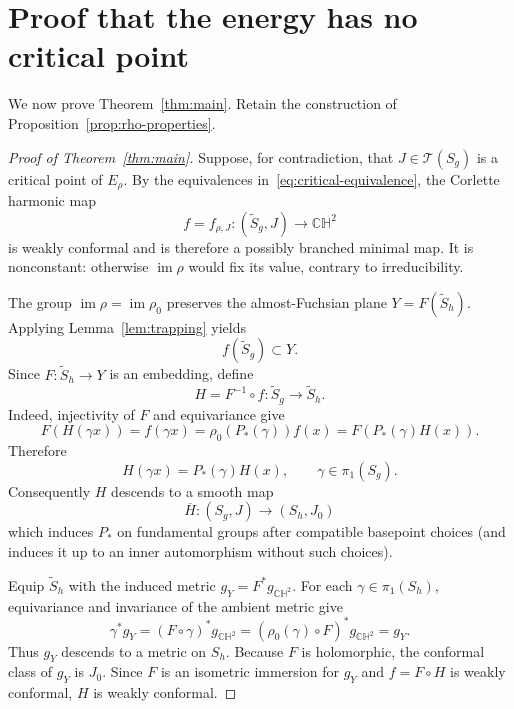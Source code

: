 \documentclass[12pt]{amsart}
\theoremstyle{remark}
\newcommand{\CH}{\mathbb{CH}}
\newcommand{\Teich}{\mathcal T}
\newcommand{\im}{\operatorname{im}}
\begin{document}
\section{Proof that the energy has no critical point}

We now prove Theorem~\ref{thm:main}.  Retain the construction of
Proposition~\ref{prop:rho-properties}.

\begin{proof}[Proof of Theorem~\ref{thm:main}]
Suppose, for contradiction, that $J\in\Teich(S_g)$ is a critical point of
$E_\rho$.  By the equivalences in~\eqref{eq:critical-equivalence}, the
Corlette harmonic map
\[
f=f_{\rho,J}:(\widetilde S_g,J)\longrightarrow\CH^2
\]
is weakly conformal and is therefore a possibly branched minimal map.  It is
nonconstant: otherwise $\im\rho$ would fix its value, contrary to
irreducibility.

The group $\im\rho=\im\rho_0$ preserves the almost-Fuchsian plane
$Y=F(\widetilde S_h)$.  Applying Lemma~\ref{lem:trapping} yields
\begin{equation}\label{eq:image-in-Y}
 f(\widetilde S_g)\subset Y.
\end{equation}
Since $F:\widetilde S_h\to Y$ is an embedding, define
\[
 H=F^{-1}\circ f:\widetilde S_g\longrightarrow\widetilde S_h.
\]
Indeed, injectivity of $F$ and equivariance give
\[
 F(H(\gamma x))=f(\gamma x)=\rho_0(P_*(\gamma))f(x)
 =F(P_*(\gamma)H(x)).
\]
Therefore
\begin{equation}\label{eq:H-equivariance}
 H(\gamma x)=P_*(\gamma)H(x),
 \qquad \gamma\in\pi_1(S_g).
\end{equation}
Consequently $H$ descends to a smooth map
\begin{equation}\label{eq:Hbar}
 \overline H:(S_g,J)\longrightarrow(S_h,J_0)
\end{equation}
which induces $P_*$ on fundamental groups after compatible basepoint choices
(and induces it up to an inner automorphism without such choices).

Equip $\widetilde S_h$ with the induced metric $g_Y=F^*g_{\CH^2}$.  For each
$\gamma\in\pi_1(S_h)$, equivariance and invariance of the ambient metric give
\[
 \gamma^*g_Y=(F\circ\gamma)^*g_{\CH^2}
 =(\rho_0(\gamma)\circ F)^*g_{\CH^2}=g_Y.
\]
Thus $g_Y$ descends to a metric on $S_h$.  Because $F$ is holomorphic, the
conformal class of $g_Y$ is $J_0$.  Since $F$ is an isometric immersion for
$g_Y$ and $f=F\circ H$ is weakly conformal, $H$ is weakly conformal.


\end{proof}
\end{document}
